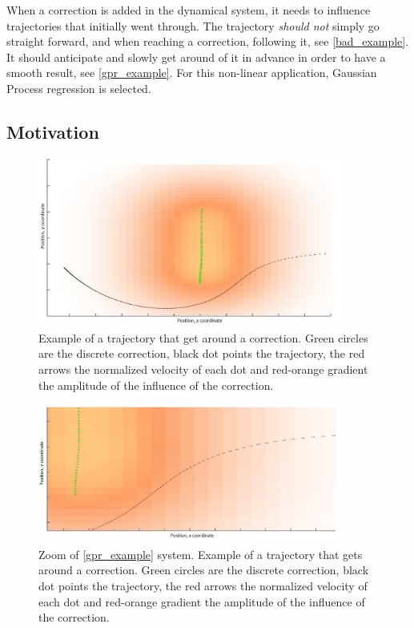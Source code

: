 When a correction is added in the dynamical system, it needs to influence trajectories that initially went through. The trajectory \emph{should not} simply go straight forward, and when reaching a correction, following it, see \autoref{bad_example}. It should anticipate and slowly get around of it in advance in order to have a smooth result, see \autoref{gpr_example}. For this non-linear application, Gaussian Process regression is selected.

\subsection{Motivation}

\begin{figure}[H]
\centering
\includegraphics[width=10cm]{img/gpr_ex_unzoom.jpg}
\caption{Example of a trajectory that get around a correction. Green circles are the discrete correction, black dot points the trajectory, the red arrows the normalized velocity of each dot and red-orange gradient the amplitude of the influence of the correction.}
\label{gpr_example}
\end{figure}

\begin{figure}[H]
 \centering
\includegraphics[width=10cm]{img/gpr_ex.jpg}
\caption{Zoom of \autoref{gpr_example} system. Example of a trajectory that gets around a correction. Green circles are the discrete correction, black dot points the trajectory, the red arrows the normalized velocity of each dot and red-orange gradient the amplitude of the influence of the correction.}
\end{figure}


